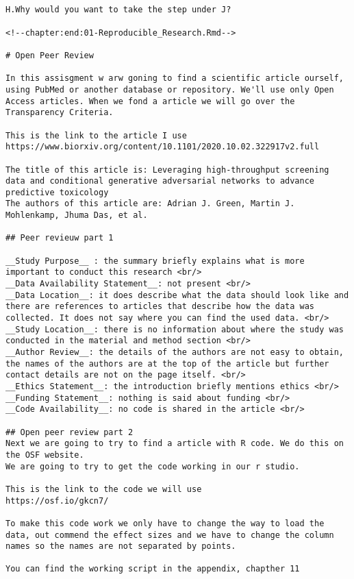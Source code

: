 \documentclass[
]{book}
\begin{document}
\begin{verbatim}


H.Why would you want to take the step under J?

<!--chapter:end:01-Reproducible_Research.Rmd-->

# Open Peer Review

In this assisgment w arw goning to find a scientific article ourself, using PubMed or another database or repository. We'll use only Open Access articles. When we fond a article we will go over the Transparency Criteria.

This is the link to the article I use
https://www.biorxiv.org/content/10.1101/2020.10.02.322917v2.full

The title of this article is: Leveraging high-throughput screening data and conditional generative adversarial networks to advance predictive toxicology
The authors of this article are: Adrian J. Green, Martin J. Mohlenkamp, Jhuma Das, et al.

## Peer revieuw part 1

__Study Purpose__ : the summary briefly explains what is more important to conduct this research <br/>
__Data Availability Statement__: not present <br/>
__Data Location__: it does describe what the data should look like and there are references to articles that describe how the data was collected. It does not say where you can find the used data. <br/>
__Study Location__: there is no information about where the study was conducted in the material and method section <br/>
__Author Review__: the details of the authors are not easy to obtain, the names of the authors are at the top of the article but further contact details are not on the page itself. <br/>
__Ethics Statement__: the introduction briefly mentions ethics <br/>
__Funding Statement__: nothing is said about funding <br/>
__Code Availability__: no code is shared in the article <br/>

## Open peer review part 2
Next we are going to try to find a article with R code. We do this on the OSF website.
We are going to try to get the code working in our r studio. 

This is the link to the code we will use
https://osf.io/gkcn7/

To make this code work we only have to change the way to load the data, out commend the effect sizes and we have to change the column names so the names are not separated by points. 

You can find the working script in the appendix, chapther 11


\end{verbatim}
\end{document}
